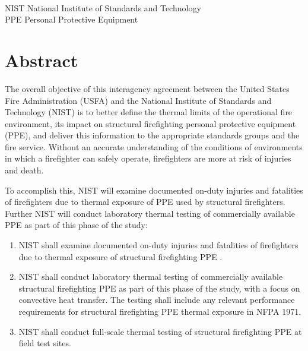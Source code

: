 \documentclass[12pt,oneside]{book}
\begin{document}
\begin{tabbing}
\hspace{1.5in} \= \\
NIST \> National Institute of Standards and Technology \\
PPE \> Personal Protective Equipment \\
\end{tabbing}

\mainmatter

\chapter*{\centering Abstract}
The overall objective of this interagency agreement between the United States Fire Administration (USFA) and the National Institute of Standards and Technology (NIST) is to better define the thermal limits of the operational fire environment, its impact on structural firefighting personal protective equipment (PPE), and deliver this information to the appropriate standards groups and the fire service. Without an accurate understanding of the conditions of environments in which a firefighter can safely operate, firefighters are more at risk of injuries and death.

To accomplish this, NIST will examine documented on-duty injuries and fatalities of firefighters due to thermal exposure of PPE used by structural firefighters. Further NIST will conduct laboratory thermal testing of commercially available PPE as part of this phase of the study:
\begin{enumerate}
\item NIST shall examine documented on-duty injuries and fatalities of firefighters due to thermal exposure of structural firefighting PPE \cite{Weinschenk:Chicago,Overholt:San_Francisco,Weinschenk:PGCounty}.
\item NIST shall conduct laboratory thermal testing of commercially available structural firefighting PPE as part of this phase of the study, with a focus on convective heat transfer. The testing shall include any relevant performance requirements for structural firefighting PPE thermal exposure in NFPA 1971.
\item NIST shall conduct full-scale thermal testing of structural firefighting PPE at field test sites.
\end{enumerate}
\end{document}
